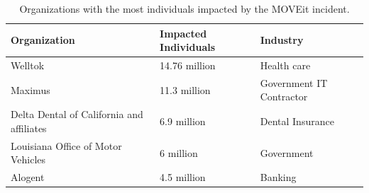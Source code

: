 \documentclass{article}
\begin{document}
\begin{table}[htbp]
    \centering
    \renewcommand{\arraystretch}{1.3}
    \caption{Organizations with the most individuals impacted by the MOVEit incident.}
    \label{tab:moveit_impact}
    \begin{tabularx}{\textwidth}{>{\raggedright\arraybackslash}X l >{\raggedright\arraybackslash}p{4.5cm}}
        \toprule
        \textbf{Organization} & \textbf{Impacted Individuals} & \textbf{Industry} \\
        \midrule
        Welltok & 14.76 million & Health care \\
        Maximus & 11.3 million & Government IT Contractor \\
        Delta Dental of California and affiliates & 6.9 million & Dental Insurance \\
        Louisiana Office of Motor Vehicles & 6 million & Government \\
        Alogent & 4.5 million & Banking \\
        \bottomrule
    \end{tabularx}
\end{table}
\end{document}
